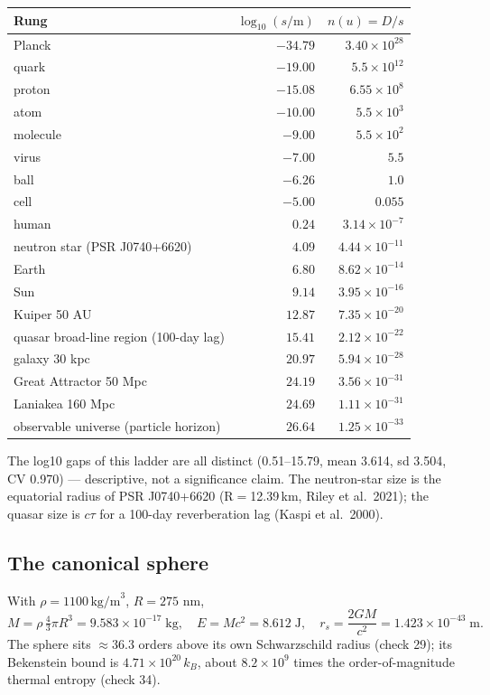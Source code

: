 \documentclass[11pt]{article}
\begin{document}
\begin{center}
\begin{tabular}{lrr}
\toprule
Rung & \(\log_{10}(s/\text{m})\) & \(n(u)=D/s\) \\
\midrule
Planck & $-34.79$ & $3.40\times10^{28}$ \\
quark & $-19.00$ & $5.5\times10^{12}$ \\
proton & $-15.08$ & $6.55\times10^8$ \\
atom & $-10.00$ & $5.5\times10^3$ \\
molecule & $-9.00$ & $5.5\times10^2$ \\
virus & $-7.00$ & $5.5$ \\
ball & $-6.26$ & $1.0$ \\
cell & $-5.00$ & $0.055$ \\
human & $0.24$ & $3.14\times10^{-7}$ \\
neutron star (PSR J0740+6620) & $4.09$ & $4.44\times10^{-11}$ \\
Earth & $6.80$ & $8.62\times10^{-14}$ \\
Sun & $9.14$ & $3.95\times10^{-16}$ \\
Kuiper 50 AU & $12.87$ & $7.35\times10^{-20}$ \\
quasar broad-line region (100-day lag) & $15.41$ & $2.12\times10^{-22}$ \\
galaxy 30 kpc & $20.97$ & $5.94\times10^{-28}$ \\
Great Attractor 50 Mpc & $24.19$ & $3.56\times10^{-31}$ \\
Laniakea 160 Mpc & $24.69$ & $1.11\times10^{-31}$ \\
observable universe (particle horizon) & $26.64$ & $1.25\times10^{-33}$ \\
\bottomrule
\end{tabular}
\end{center}

The log10 gaps of this ladder are all distinct (0.51--15.79, mean 3.614,
sd 3.504, CV 0.970) --- descriptive, not a significance claim. The
neutron-star size is the equatorial radius of PSR J0740+6620
(R$=$12.39\,km, Riley et al.\ 2021); the quasar size is $c\tau$ for a
100-day reverberation lag (Kaspi et al.\ 2000).

\subsection{The canonical sphere}
With \(\rho=1100\,\text{kg/m}^3\), \(R=275\) nm,
\[
M=\rho\,\tfrac43\pi R^3=9.583\times10^{-17}\;\text{kg},\quad
E=Mc^2=8.612\;\text{J},\quad
r_s=\frac{2GM}{c^2}=1.423\times10^{-43}\;\text{m}.
\]
The sphere sits \(\approx36.3\) orders above its own Schwarzschild radius
(check 29); its Bekenstein bound is \(4.71\times10^{20}\,k_B\), about
\(8.2\times10^9\) times the order-of-magnitude thermal entropy (check 34).
\end{document}
